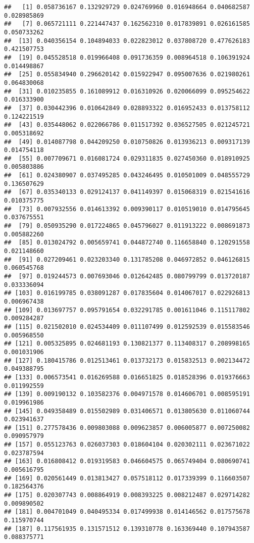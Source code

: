 \documentclass[
]{article}
\begin{document}
\begin{verbatim}
##   [1] 0.058736167 0.132929729 0.024769960 0.016948664 0.040682587 0.028985869
##   [7] 0.065721111 0.221447437 0.162562310 0.017839891 0.026161585 0.050733262
##  [13] 0.040356154 0.104894033 0.022823012 0.037808720 0.477626183 0.421507753
##  [19] 0.045528518 0.019966408 0.091736359 0.008964518 0.106391924 0.014498867
##  [25] 0.055834940 0.296620142 0.015922947 0.095007636 0.021980261 0.064830068
##  [31] 0.010235855 0.161089912 0.016310926 0.020066099 0.095254622 0.016333900
##  [37] 0.030442396 0.010642849 0.028893322 0.016952433 0.013758112 0.124221519
##  [43] 0.035448062 0.022066786 0.011517392 0.036527505 0.021245721 0.005318692
##  [49] 0.014087798 0.044209250 0.010750826 0.013936213 0.009317139 0.014754118
##  [55] 0.007709671 0.016081724 0.029311835 0.027450360 0.018910925 0.005803886
##  [61] 0.024380907 0.037495285 0.043246495 0.010501009 0.048555729 0.136507629
##  [67] 0.035340133 0.029124137 0.041149397 0.015068319 0.021541616 0.010375775
##  [73] 0.007932556 0.014613392 0.009390117 0.010519010 0.014795645 0.037675551
##  [79] 0.050935290 0.017224865 0.045796027 0.011913222 0.008691873 0.005882260
##  [85] 0.013024792 0.005659741 0.044872740 0.116658840 0.120291558 0.021148660
##  [91] 0.027209461 0.023203340 0.131785208 0.046972852 0.046126815 0.060545768
##  [97] 0.019244573 0.007693046 0.012642485 0.080799799 0.013720187 0.033336094
## [103] 0.016199785 0.038091287 0.017835604 0.014067017 0.022926813 0.006967438
## [109] 0.013697757 0.095791654 0.032291785 0.001611046 0.115117802 0.009284287
## [115] 0.021502010 0.024534409 0.011107499 0.012592539 0.015583546 0.005968550
## [121] 0.005325895 0.024681193 0.130821377 0.113408317 0.208998165 0.001031906
## [127] 0.180415786 0.012513461 0.013732173 0.015832513 0.002134472 0.049388795
## [133] 0.006573541 0.016269588 0.016651825 0.018528396 0.019376663 0.011992559
## [139] 0.009190132 0.103582376 0.004971578 0.014606701 0.008595191 0.019961986
## [145] 0.049358489 0.015502989 0.031406571 0.013805630 0.011060744 0.023941637
## [151] 0.277578436 0.009803088 0.009623857 0.006005877 0.007250082 0.090957979
## [157] 0.055123763 0.026037303 0.018604104 0.020302111 0.023671022 0.023787594
## [163] 0.016808412 0.019319583 0.046604575 0.065749404 0.080690741 0.005616795
## [169] 0.020561449 0.013813427 0.057518112 0.017339399 0.116603507 0.182564376
## [175] 0.020307743 0.008864919 0.008393225 0.008212487 0.029714282 0.009890502
## [181] 0.004701049 0.040495334 0.017499938 0.014146562 0.017575678 0.115970744
## [187] 0.117561935 0.131571512 0.139310778 0.163369440 0.107943587 0.088375771

\end{verbatim}
\end{document}
